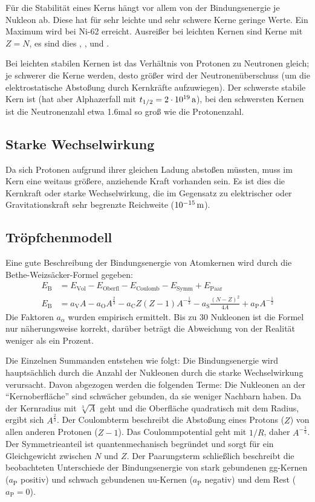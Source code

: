 \documentclass[a4paper]{scrartcl}
\begin{document}
Für die Stabilität eines Kerns hängt vor allem von der Bindungsenergie je Nukleon ab. Diese hat für sehr leichte und sehr schwere Kerne geringe Werte. Ein Maximum wird bei Ni-62 erreicht. Ausreißer bei leichten Kernen sind Kerne mit $Z = N$, es sind dies , ,  und .

Bei leichten stabilen Kernen ist das Verhältnis von Protonen zu Neutronen gleich; je schwerer die Kerne werden, desto größer wird der Neutronenüberschuss (um die elektrostatische Abstoßung durch Kernkräfte aufzuwiegen). Der schwerste stabile Kern ist  (hat aber Alphazerfall mit $t_{1/2} = \unit[2\cdot 10^{19}]{a}$), bei den schwersten Kernen ist die Neutronenzahl etwa 1.6mal so groß wie die Protonenzahl.

\subsection{Starke Wechselwirkung}
Da sich Protonen aufgrund ihrer gleichen Ladung abstoßen müssten, muss im Kern eine weitaus größere, anziehende Kraft vorhanden sein. Es ist dies die Kernkraft oder starke Wechselwirkung, die im Gegensatz zu elektrischer oder Gravitationskraft sehr begrenzte Reichweite ($\unit[10^{-15}]{m}$).

\subsection{Tröpfchenmodell}
Eine gute Beschreibung der Bindungsenergie von Atomkernen wird durch die Bethe-Weizsäcker-Formel gegeben:
\begin{align*}
  E_\text{B} &= E_\text{Vol} - E_\text{Oberfl} - E_\text{Coulomb} - E_\text{Symm} + E_\text{Paar} \\
  E_\text{B} &= a_\text{V}A - a_\text{O}A^{\frac{2}{3}} - a_\text{C}Z(Z-1)A^{-\frac{1}{3}} - a_\text{S} \frac{(N-Z)^2}{4A} + a_\text{P} A^{-\frac{1}{2}}
\end{align*}
Die Faktoren $a_\alpha$ wurden empirisch ermittelt. Bis zu 30 Nukleonen ist die Formel nur näherungsweise korrekt, darüber beträgt die Abweichung von der Realität weniger als ein Prozent.

Die Einzelnen Summanden entstehen wie folgt: Die Bindungsenergie wird hauptsächlich durch die Anzahl der Nukleonen durch die starke Wechselwirkung verursacht. Davon abgezogen werden die folgenden Terme: Die Nukleonen an der "`Kernoberfläche"' sind schwächer gebunden, da sie weniger Nachbarn haben. Da der Kernradius mit $\sqrt[3]{A}$ geht und die Oberfläche quadratisch mit dem Radius, ergibt sich $A^{\frac{2}{3}}$. Der Coulombterm beschreibt die Abstoßung eines Protons ($Z$) von allen anderen Protonen ($Z-1$). Das Coulommpotential geht mit $1/R$, daher $A^{-\frac{1}{3}}$. Der Symmetrieanteil ist quantenmechanisch begründet und sorgt für ein Gleichgewicht zwischen $N$ und $Z$. Der Paarungsterm schließlich beschreibt die beobachteten Unterschiede der Bindungsenergie von stark gebundenen gg-Kernen ($a_\text{P}$ positiv) und schwach gebundenen uu-Kernen ($a_\text{P}$ negativ) und dem Rest ($a_\text{P}=0$).
\end{document}
